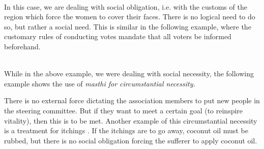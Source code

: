  \\
In this case, we are dealing with social obligation, i.e. with the customs of the region which force the women to cover their faces. There is no logical need to do so, but rather a social need. This is similar in the following example, where the customary rules of conducting votes mandate that all voters be informed beforehand.

 \\ 

While in the above example, we were dealing with social necessity, the following example shows the use of \em masthi \em for circumstantial necessity.

\kuckn

There is no external force dictating the association members to put new people in the steering committee. But if they want to meet a certain goal (to reinspire vitality), then this  is to be met. Another example of this circumstantial necessity is a treatment for itchings . If the itchings are to go away, coconut oil must be rubbed, but there is no social obligation forcing the sufferer to apply coconut oil.


 \\

